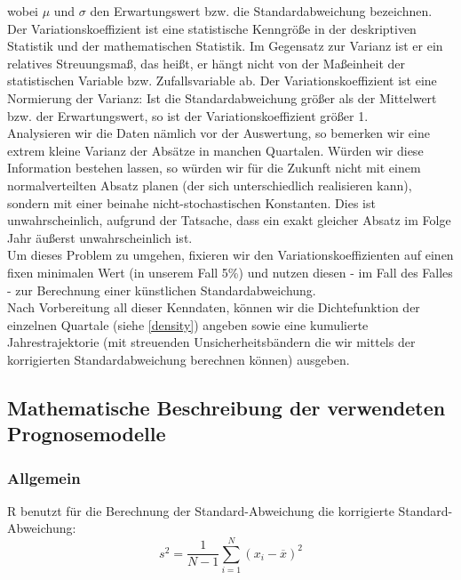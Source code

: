 \documentclass[a4paper,11pt]{article}
\begin{document}
wobei $\mu$ und $\sigma$ den Erwartungswert bzw. die Standardabweichung bezeichnen. Der Variationskoeffizient ist eine statistische Kenngröße in der deskriptiven Statistik und der mathematischen Statistik. Im Gegensatz zur Varianz ist er ein relatives Streuungsmaß, das heißt, er hängt nicht von der Maßeinheit der statistischen Variable bzw. Zufallsvariable ab. Der Variationskoeffizient ist eine Normierung der Varianz: Ist die Standardabweichung größer als der Mittelwert bzw. der Erwartungswert, so ist der Variationskoeffizient größer 1.\\

Analysieren wir die Daten nämlich vor der Auswertung, so bemerken wir eine extrem kleine Varianz der Absätze in manchen Quartalen. Würden wir diese Information bestehen lassen, so würden wir für die Zukunft nicht mit einem normalverteilten Absatz planen (der sich unterschiedlich realisieren kann), sondern mit einer beinahe nicht-stochastischen Konstanten. Dies ist unwahrscheinlich, aufgrund der Tatsache, dass ein exakt gleicher Absatz im Folge Jahr äußerst unwahrscheinlich ist.\\

Um dieses Problem zu umgehen, fixieren wir den Variationskoeffizienten auf einen fixen minimalen Wert (in unserem Fall 5\%) und nutzen diesen - im Fall des Falles - zur Berechnung einer künstlichen Standardabweichung.\\

Nach Vorbereitung all dieser Kenndaten, können wir die Dichtefunktion der einzelnen Quartale (siehe \ref{density}) angeben sowie eine kumulierte Jahrestrajektorie (mit streuenden Unsicherheitsbändern die wir mittels der korrigierten Standardabweichung berechnen können) ausgeben.

\subsection{Mathematische Beschreibung der verwendeten Prognosemodelle}

\subsubsection{Allgemein}

R benutzt für die Berechnung der Standard-Abweichung \cite{sd} die korrigierte Standard-Abweichung:
\begin{equation}
	s^{2}={\frac {1}{N-1}}\sum _{i=1}^{N}(x_{i}-{\overline {x}})^{2}
\end{equation}
\end{document}

